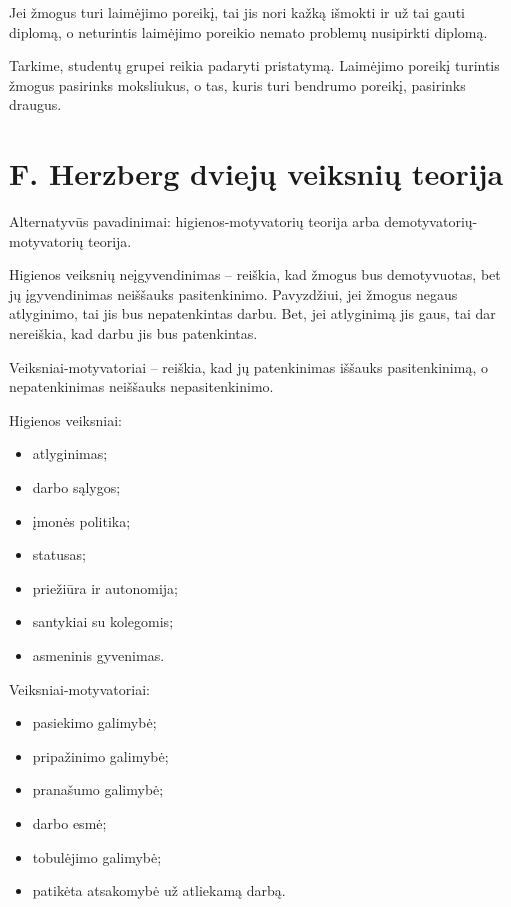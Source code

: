 \begin{exmp}
  Jei žmogus turi laimėjimo poreikį, tai jis nori kažką išmokti ir už
  tai gauti diplomą, o neturintis laimėjimo poreikio nemato problemų
  nusipirkti diplomą.
\end{exmp}

\begin{exmp}
  Tarkime, studentų grupei reikia padaryti pristatymą. Laimėjimo poreikį
  turintis žmogus pasirinks moksliukus, o tas, kuris turi bendrumo
  poreikį, pasirinks draugus.
\end{exmp}

\section{F. Herzberg dviejų veiksnių teorija}

Alternatyvūs pavadinimai: higienos-motyvatorių teorija arba
demotyvatorių-motyvatorių teorija.

Higienos veiksnių neįgyvendinimas – reiškia, kad žmogus bus demotyvuotas, 
bet jų įgyvendinimas neiššauks pasitenkinimo. Pavyzdžiui, jei žmogus
negaus atlyginimo, tai jis bus nepatenkintas darbu. Bet, jei atlyginimą
jis gaus, tai dar nereiškia, kad darbu jis bus patenkintas.

Veiksniai-motyvatoriai – reiškia, kad jų patenkinimas iššauks pasitenkinimą,
o nepatenkinimas neiššauks nepasitenkinimo.

Higienos veiksniai:
\begin{itemize}
  \item atlyginimas;
  \item darbo sąlygos;
  \item įmonės politika;
  \item statusas;
  \item priežiūra ir autonomija;
  \item santykiai su kolegomis;
  \item asmeninis gyvenimas.
\end{itemize}

Veiksniai-motyvatoriai:
\begin{itemize}
  \item pasiekimo galimybė;
  \item pripažinimo galimybė;
  \item pranašumo galimybė;
  \item darbo esmė;
  \item tobulėjimo galimybė;
  \item patikėta atsakomybė už atliekamą darbą.
\end{itemize}

